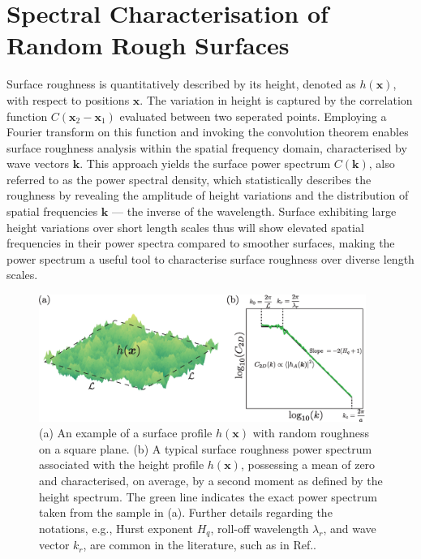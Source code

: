 \documentclass[a4,12pt]{article} %
\begin{document}
\section*{Spectral Characterisation of Random Rough Surfaces}
Surface roughness is quantitatively described by its height, denoted as $h(\boldsymbol{x})$, with respect to positions $\boldsymbol{x}$. The variation in height is captured by the correlation function $C(\boldsymbol{x}_2 - \boldsymbol{x}_1)$ evaluated between two seperated points. Employing a Fourier transform on this function and invoking the convolution theorem enables surface roughness analysis within the spatial frequency domain, characterised by wave vectors $\boldsymbol{k}$. This approach yields the surface power spectrum $C(\boldsymbol{k})$, also referred to as the power spectral density, which statistically describes the roughness by revealing the amplitude of height variations and the distribution of spatial frequencies $\boldsymbol{k}$ --- the inverse of the wavelength. Surface exhibiting large height variations over short length scales thus will show elevated spatial frequencies in their power spectra compared to smoother surfaces, making the power spectrum a useful tool to characterise surface roughness over diverse length scales.

\begin{figure}
    \centering
    \includegraphics[width=0.95\textwidth]{Figures/fig1.eps}
    \caption{(a) An example of a surface profile $h(\boldsymbol{x})$ with random roughness on a square plane. (b) A typical surface roughness power spectrum associated with the height profile $h(\boldsymbol{x})$, possessing a mean of zero and characterised, on average, by a second moment as defined by the height spectrum. The green line indicates the exact power spectrum taken from the sample in (a). Further details regarding the notations, e.g., Hurst exponent $H_q$, roll-off wavelength $\lambda_r$, and wave vector $k_r$, are common in the literature, such as in Ref.\cite{persson2004nature}.}
    \label{fig:Spectrum}
\end{figure}
\end{document}
